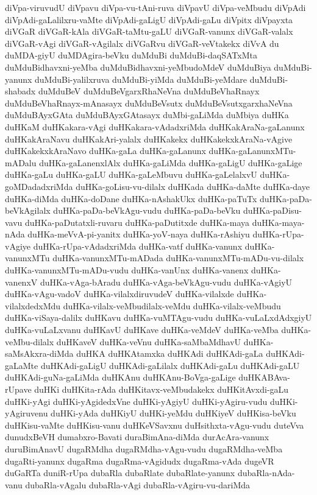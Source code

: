 {diVpa-viruvudU
diVpavu
diVpa-vu-tAni-ruva
diVpavU
diVpa-veMbudu
diVpAdi
diVpAdi-gaLalilxru-vaMte
diVpAdi-gaLigU
diVpAdi-gaLu
diVpitx
diVpayxta
diVGaR
diVGaR-kAla
diVGaR-taMtu-gaLU
diVGaR-vanunx
diVGaR-valalx
diVGaR-vAgi
diVGaR-vAgilalx
diVGaRvu
diVGaR-veVtakekx
diVvA
du
duMDA-giyU
duMDAgira-beVku
duMduBi
duMduBi-daqSATxMta
duMduBidhavxni-yeMba
duMduBidhavxni-yeMbudoMdeV
duMduBiya
duMduBi-yanunx
duMduBi-yalilxruva
duMduBi-yiMda
duMduBi-yeMdare
duMduBi-shabadx
duMduBeV
duMduBeVgarxRhaNeVna
duMduBeVhaRnayx
duMduBeVhaRnayx-mAnasayx
duMduBeVsutx
duMduBeVsutxgarxhaNeVna
duMduBAyxGAta
duMduBAyxGAtasayx
duMbi-gaLiMda
duMbiya
duHKa
duHKaM
duHKakara-vAgi
duHKakara-vAdadxriMda
duHKakAraNa-gaLanunx
duHKakAraNavu
duHKakAri-yalalx
duHKakekx
duHKakekxkAraNa-vAgive
duHKakekxkAraNavo
duHKa-gaLa
duHKa-gaLanunx
duHKa-gaLanunxMTu-mADalu
duHKa-gaLanenxlAlx
duHKa-gaLiMda
duHKa-gaLigU
duHKa-gaLige
duHKa-gaLu
duHKa-gaLU
duHKa-gaLeMbuvu
duHKa-gaLelalxvU
duHKa-goMDadadxriMda
duHKa-goLisu-vu-dilalx
duHKada
duHKa-daMte
duHKa-daye
duHKa-diMda
duHKa-doDane
duHKa-nAshakUkx
duHKa-paTuTx
duHKa-paDa-beVkAgilalx
duHKa-paDa-beVkAgu-vudu
duHKa-paDa-beVku
duHKa-paDisu-vavu
duHKa-paDutatxli-ruvaru
duHKa-paDutitxde
duHKa-maya
duHKa-maya-nAda
duHKa-meVvA-pi-yanitx
duHKa-yoV-naya
duHKa-rAshiyu
duHKa-rUpa-vAgiye
duHKa-rUpa-vAdadxriMda
duHKa-vatf
duHKa-vanunx
duHKa-vanunxMTu
duHKa-vanunxMTu-mADada
duHKa-vanunxMTu-mADu-vu-dilalx
duHKa-vanunxMTu-mADu-vudu
duHKa-vanUnx
duHKa-vanenx
duHKa-vanenxV
duHKa-vAga-bAradu
duHKa-vAga-beVkAgu-vudu
duHKa-vAgiyU
duHKa-vAgu-vadoV
duHKa-vilalxdiruvudeV
duHKa-vilalxde
duHKa-vilalxdedxMdu
duHKa-vilalx-veMbudilalx-veMdu
duHKa-vilalx-veMbudu
duHKa-viSaya-dalilx
duHKavu
duHKa-vuMTAgu-vudu
duHKa-vuLaLxdAdxgiyU
duHKa-vuLaLxvanu
duHKavU
duHKave
duHKa-veMdeV
duHKa-veMba
duHKa-veMbu-dilalx
duHKaveV
duHKa-veVnu
duHKa-saMbaMdhavU
duHKa-saMsAkxra-diMda
duHKA
duHKAtamxka
duHKAdi
duHKAdi-gaLa
duHKAdi-gaLaMte
duHKAdi-gaLigU
duHKAdi-gaLilalx
duHKAdi-gaLu
duHKAdi-gaLU
duHKAdi-guNa-gaLiMda
duHKAnu
duHKAnu-BoVga-gaLige
duHKABAva-rUpave
duHKi
duHKita-rAda
duHKitavx-veMbudakekx
duHKitAvxdi-gaLu
duHKi-yAgi
duHKi-yAgidedxVne
duHKi-yAgiyU
duHKi-yAgiru-vudu
duHKi-yAgiruvenu
duHKi-yAda
duHKiyU
duHKi-yeMdu
duHKiyeV
duHKisa-beVku
duHKisu-vaMte
duHKisu-vanu
duHKeVSavxnu
duHsithxta-vAgu-vudu
duteVva
dunudxBeVH
dumabxro-Bavati
duraBimAna-diMda
durAcAra-vanunx
duruBimAnavU
dugaRMdha
dugaRMdha-vAgu-vudu
dugaRMdha-veMba
dugaRti-yanunx
dugaRma
dugaRma-vAgidudx
dugaRma-vAda
dugeVR
duGaRTa
duniR-rUpa
dubaRla
dubaRlate
dubaRlate-yanunx
dubaRla-nAda-vanu
dubaRla-vAgalu
dubaRla-vAgi
dubaRla-vAgiru-vu-dariMda
}
